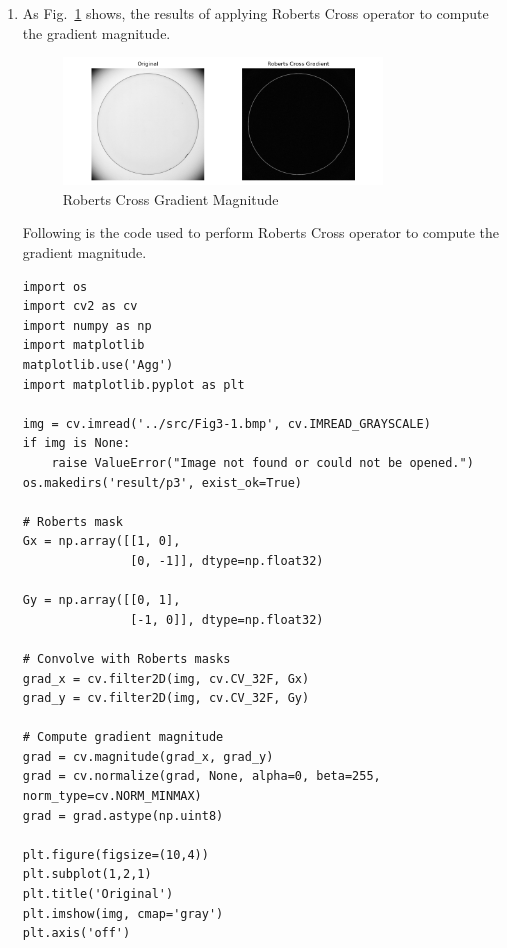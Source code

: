 \documentclass[12pt,a4paper]{article}
\begin{document}
\begin{enumerate}
\begin{verbatim}
sizes = [1, 3, 5, 9, 15, 35]
for m in sizes:
    smooth = cv.blur(img, (m, m))
    plt.figure()
    plt.title(f"Averaging Filter m={m}")
    plt.imshow(smooth, cmap='gray')
    plt.axis('off')
    plt.savefig(f'result/p2/averaging_filter_m_{m}.png')
    \end{verbatim}
    \newpage
    \item As Fig.~\ref{fig:roberts_cross} shows, the results of applying Roberts Cross operator to compute the gradient magnitude.
    \begin{figure}[H]
        \centering
        \includegraphics[width=0.8\textwidth]{code/result/p3/roberts_cross_gradient.png}
        \caption{Roberts Cross Gradient Magnitude}
        \label{fig:roberts_cross}
    \end{figure}
    Following is the code used to perform Roberts Cross operator to compute the gradient magnitude.
    \begin{verbatim}
import os
import cv2 as cv
import numpy as np
import matplotlib
matplotlib.use('Agg')
import matplotlib.pyplot as plt

img = cv.imread('../src/Fig3-1.bmp', cv.IMREAD_GRAYSCALE)
if img is None:
    raise ValueError("Image not found or could not be opened.")
os.makedirs('result/p3', exist_ok=True)

# Roberts mask
Gx = np.array([[1, 0],
               [0, -1]], dtype=np.float32)

Gy = np.array([[0, 1],
               [-1, 0]], dtype=np.float32)

# Convolve with Roberts masks
grad_x = cv.filter2D(img, cv.CV_32F, Gx)
grad_y = cv.filter2D(img, cv.CV_32F, Gy)

# Compute gradient magnitude
grad = cv.magnitude(grad_x, grad_y)
grad = cv.normalize(grad, None, alpha=0, beta=255, norm_type=cv.NORM_MINMAX)
grad = grad.astype(np.uint8)

plt.figure(figsize=(10,4))
plt.subplot(1,2,1)
plt.title('Original')
plt.imshow(img, cmap='gray')
plt.axis('off')


\end{verbatim}
\end{enumerate}
\end{document}
